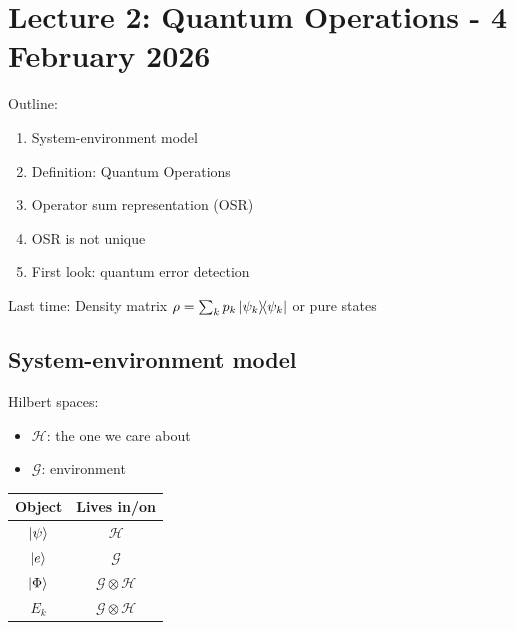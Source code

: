 \section{Lecture 2: Quantum Operations - 4 February 2026}
Outline: 
\begin{enumerate}[label=(\Roman*)]
    \item System-environment model
    \item Definition: Quantum Operations
    \item Operator sum representation (OSR)
    \item OSR is not unique
    \item First look: quantum error detection
\end{enumerate}
Last time: Density matrix $\rho = \sum_k p_k \ketbra{\psi_k}$ or pure states  


\subsection{System-environment model}
Hilbert spaces: 
\begin{itemize}
    \item $\mathcal{H}$: the one we care about
    \item $\mathcal{G}$: environment
\end{itemize}

\begin{center}
\begin{tabular}{ c | c }
Object & Lives in/on  \\
\hline
$\ket{\psi}$ & $\mathcal{H}$  \\  
$\ket{e}$ & $\mathcal{G}$  \\  
$\ket{\Phi}$ & $\mathcal{G} \otimes \mathcal{H}$   \\  
$E_k$ & $\mathcal{G} \otimes \mathcal{H}$   \\  
\end{tabular}
\end{center}

